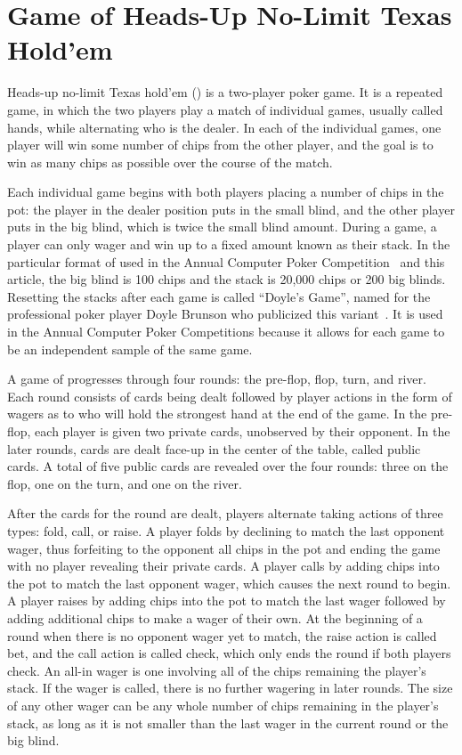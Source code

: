 \section*{Game of Heads-Up No-Limit Texas Hold'em}
Heads-up no-limit Texas hold'em (\HUNL{}) is a two-player poker game. It is a repeated game, in which the
two players play a match of individual games, usually called hands,
while alternating
who is the dealer. In each of the individual games, one player will win some number of chips
from the other player, and the goal is to win as many chips as possible over the course of the
match.  

Each individual game begins with both players placing a number of chips in the pot: the
player in the dealer position puts in the small blind, and the other player puts in the big blind,
which is twice the small blind amount.   
During a game, a player can only wager and win up to a fixed amount known as their stack.  In the
particular format of \HUNL{} used in the Annual Computer Poker Competition~\cite{ZinkevichLittman06} and this article, the big blind is 100 chips and the stack is 20,000 chips or 200 big blinds.
Resetting the stacks after each game is called ``Doyle's Game'', named for the
professional poker player Doyle Brunson who
publicized this variant~\cite{Gilpin08:Tartanian}.  It is used in the Annual Computer Poker Competitions because it allows for each game to be an independent sample of the same game.

A game of \HUNL{} progresses through four rounds: the
pre-flop, flop, turn, and river. Each round consists of cards being dealt followed by player
actions in the form of wagers as to who will hold the strongest hand at the end of the game. In
the pre-flop, each player is given two private cards, unobserved by their opponent. In the later
rounds, cards are dealt face-up in the center of the table, called public cards. A total of five
public cards are revealed over the four rounds: three on the flop, one on the turn, and one
on the river.

After the cards for the round are dealt, players alternate taking actions of
three types: fold, call, or raise. A player folds by declining to match the last opponent wager,
thus forfeiting to the opponent all chips in the pot and ending the game with no player revealing
their private cards. A player calls by adding chips into the pot to match the last opponent wager,
which causes the next round to begin. A player raises by adding chips into the pot to match the
last wager followed by adding additional chips to make a wager of their own. At the beginning
of a round when there is no opponent wager yet to match, the raise action is called bet, and
the call action is called check, which only ends the round if both players check. 
An all-in wager is one
involving all of the chips remaining the player's stack.  If the wager is called, there is no further 
wagering in later rounds.
The size of
any other wager can be any whole number of chips remaining in the player's stack, as long as it
is not smaller than the last wager in the current round or the big blind.  

